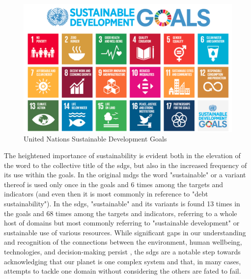 \begin{figure}[h]
	\centering
	\includegraphics[scale=0.25]{Figures/chap2/SDG.png}
	\caption[United Nations Sustainable Development Goals]{United Nations Sustainable Development Goals}
	\label{fig:sdgs}
\end{figure}

The heightened importance of sustainability is evident both in the elevation of the word to the collective title of the \acp{sdg}, but also in the increased frequency of its use within the goals. In the original \acp{mdg} the word "sustainable" or a variant thereof is used only once in the goals and 6 times among the targets and indicators (and even then it is most commonly in reference to "debt sustainability"). In the \acp{sdg}, "sustainable" and its variants is found 13 times in the goals and 68 times among the targets and indicators, referring to a whole host of domains but most commonly referring to "sustainable development" or sustainable use of various resources. While significant gaps in our understanding and recognition of the connections between the environment, human wellbeing, technologies, and decision-making persist \cite{bennichDecipheringScientificLiterature2020}, the \acp{sdg} are a notable step towards acknowledging that our planet is one complex system and that, in many cases, attempts to tackle one domain without considering the others are fated to fail. 

